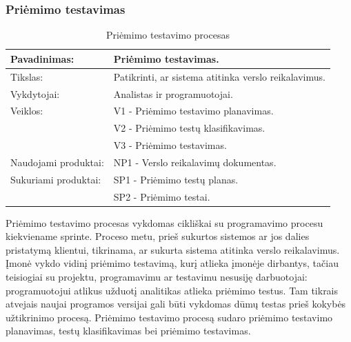 \documentclass{VUMIFPSkursinis}
\begin{document}
	\subsubsection{Priėmimo testavimas}
	\begin{center}
		\begin{table}[ht]
			\caption{Priėmimo testavimo procesas}
			\begin{tabular}{ | l | l | }
				\hline
				Pavadinimas:		& Priėmimo testavimas.					\\ \hline
				Tikslas:		& Patikrinti, ar sistema atitinka verslo reikalavimus.	\\ \hline
				Vykdytojai:		& Analistas ir programuotojai.				\\ \hline
				Veiklos:		& V1 - Priėmimo testavimo planavimas.			\\
							& V2 - Priėmimo testų klasifikavimas.			\\
							& V3 - Priėmimo testavimas.				\\ \hline
				Naudojami produktai:	& NP1 - Verslo reikalavimų dokumentas.			\\ \hline
				Sukuriami produktai:	& SP1 - Priėmimo testų planas.				\\
						 	& SP2 - Priėmimo testai.				\\ \hline
			\end{tabular}
		\end{table}
	\end{center}
	Priėmimo testavimo procesas vykdomas cikliškai su programavimo procesu kiekviename sprinte.
	Proceso metu, prieš sukurtos sistemos ar jos dalies pristatymą klientui, tikrinama, ar sukurta sistema atitinka verslo reikalavimus.
	Įmonė vykdo vidinį priėmimo testavimą, kurį atlieka įmonėje dirbantys, tačiau teisiogiai su projektu, programavimu ar testavimu nesusiję darbuotojai: programuotojui atlikus užduotį analitikas atlieka priėmimo testus.
	Tam tikrais atvejais naujai programos versijai gali būti vykdomas dūmų testas prieš kokybės užtikrinimo procesą.
	Priėmimo testavimo procesą sudaro priėmimo testavimo planavimas, testų klasifikavimas bei priėmimo testavimas.
\end{document}
